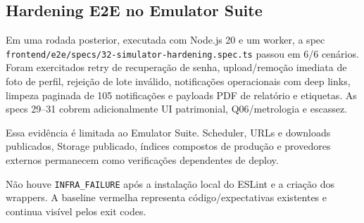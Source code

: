 \subsection{Hardening E2E no Emulator Suite}

Em uma rodada posterior, executada com Node.js 20 e um worker, a spec
\texttt{frontend/e2e/specs/32-simulator-hardening.spec.ts} passou em 6/6
cenários. Foram exercitados retry de recuperação de senha, upload/remoção
imediata de foto de perfil, rejeição de lote inválido, notificações
operacionais com deep links, limpeza paginada de 105 notificações e payloads
PDF de relatório e etiquetas. As specs 29--31 cobrem adicionalmente UI
patrimonial, Q06/metrologia e escassez.

Essa evidência é limitada ao Emulator Suite. Scheduler, URLs e downloads
publicados, Storage publicado, índices compostos de produção e provedores
externos permanecem como verificações dependentes de deploy.

Não houve \texttt{INFRA\_FAILURE} após a instalação local do ESLint e a criação
dos wrappers. A baseline vermelha representa código/expectativas existentes e
continua visível pelos exit codes.
